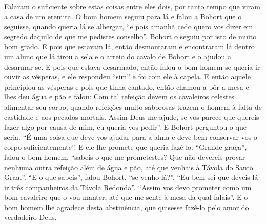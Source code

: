 Falaram o suficiente sobre estas coisas entre eles dois, por tanto tempo que
viram a casa de um eremita. O bom homem seguiu para lá e falou a Bohort que o
seguisse, quando queria lá se albergar, “e pois amanhã cedo quero vos dizer em
segredo daquilo de que me pedistes conselho”. Bohort o seguiu por isto de muito
bom grado. E pois que estavam lá, então desmontaram e encontraram lá dentro um
aluno que lá tirou a sela e o arreio do cavalo de Bohort e o ajudou a
desarmar-se. E pois que estava desarmado, então falou o bom homem se queria ir
ouvir as vésperas, e ele respondeu “sim” e foi com ele à capela. E então aquele
principiou as vésperas e pois que tinha cantado, então chamou a pôr a mesa e
lhes deu água e pão e falou: Com tal refeição devem os cavaleiros celestes
alimentar seu corpo, quando refeições muito saborosas trazem o homem à falta de
castidade e aos pecados mortais. Assim Deus me ajude, se vos parece
que quereis fazer algo por causa de mim, eu queria vos pedir”. E Bohort
perguntou o que seria. “É uma coisa que deve vos ajudar para a alma e deve bem
conservar-vos o corpo suficientemente”. E ele lhe promete que queria fazê-lo.
“Grande graça”, falou o bom homem, “sabeis o que me prometestes? Que não
devereis provar nenhuma outra refeição além de água e pão, até que venhais à
Távola do Santo Graal”. “E o que sabeis”, falou Bohort, “se venho
lá?”. “Eu bem sei que deveis lá ir três companheiros da Távola Redonda”. “Assim
vos devo prometer como um bom cavaleiro que o vou manter, até que me sente à
mesa da qual falais”. E o bom homem lhe agradece desta abstinência,
que quisesse fazê-lo pelo amor do verdadeiro Deus.

